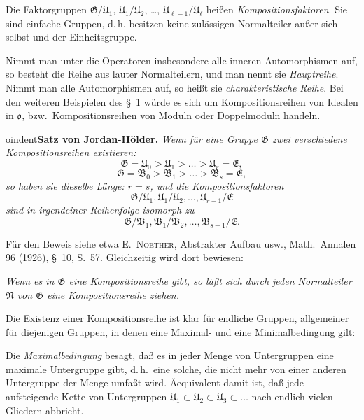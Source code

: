 \documentclass[12pt,a4paper]{article}
\theoremstyle{definition}
\begin{document}
Die Faktorgruppen $\mathfrak{G}/\mathfrak{U}_1$,
$\mathfrak{U}_1/\mathfrak{U}_2$, \dots,
$\mathfrak{U}_{\ell-1}/\mathfrak{U}_\ell$ hei\ss en
\textit{Kompositionsfaktoren}. Sie sind einfache Gruppen, d.\,h. besitzen keine zul\"assigen Normalteiler au\ss er sich selbst und der
Einheitsgruppe.

Nimmt man unter die Operatoren insbesondere alle inneren
Automorphismen auf, so besteht die Reihe aus lauter Normalteilern, und
man nennt sie \textit{Hauptreihe}. Nimmt man alle Automorphismen auf, so
hei\ss t sie \textit{charakteristische Reihe}. Bei den weiteren Beispielen
des \S~1 w\"urde es sich um Kompositionsreihen von Idealen in
$\mathfrak{o}$, bzw.\ Kompositionsreihen von Moduln oder Doppelmoduln
handeln.

\medskip



oindent\textbf{Satz von Jordan-H\"older.} \textit{Wenn f\"ur eine
Gruppe $\mathfrak{G}$ zwei verschiedene Kompositionsreihen existieren:}
\[
\mathfrak{G} = \mathfrak{U}_0 > \mathfrak{U}_1 > \dots >
\mathfrak{U}_r = \mathfrak{E},
\]
\[
\mathfrak{G} = \mathfrak{B}_0 > \mathfrak{B}_1 > \dots >
\mathfrak{B}_s = \mathfrak{E},
\]
\textit{so haben sie dieselbe L\"ange: $r = s$, und die
Kompositionsfaktoren}
\[
\mathfrak{G}/\mathfrak{U}_1, \mathfrak{U}_1/\mathfrak{U}_2, \dots,
\mathfrak{U}_{r-1}/\mathfrak{E}
\]
\textit{sind in irgendeiner Reihenfolge isomorph zu}
\[
\mathfrak{G}/\mathfrak{B}_1, \mathfrak{B}_1/\mathfrak{B}_2, \dots,
\mathfrak{B}_{s-1}/\mathfrak{E}.
\]

F\"ur den Beweis siehe etwa E.\ \textsc{Noether}, Abstrakter Aufbau usw.,
Math.\ Annalen 96 (1926), \S~10, S.\ 57. Gleichzeitig wird dort bewiesen:

\textit{Wenn es in $\mathfrak{G}$ eine Kompositionsreihe gibt, so l\"a\ss t
sich durch jeden Normalteiler $\mathfrak{N}$ von $\mathfrak{G}$ eine
Kompositionsreihe ziehen.}

Die Existenz einer Kompositionsreihe ist klar f\"ur endliche Gruppen,
allgemeiner f\"ur diejenigen Gruppen, in denen eine Maximal- und eine
Minimalbedingung gilt:

Die \textit{Maximalbedingung} besagt, da\ss{} es in jeder Menge von
Untergruppen eine maximale Untergruppe gibt, d.\,h.\ eine solche, die
nicht mehr von einer anderen Untergruppe der Menge umfa\ss t wird.
\"Aequivalent damit ist, da\ss{} jede aufsteigende Kette von Untergruppen
$\mathfrak{U}_1 \subset \mathfrak{U}_2 \subset \mathfrak{U}_3 \subset \dots$
nach endlich vielen Gliedern abbricht.
\end{document}
